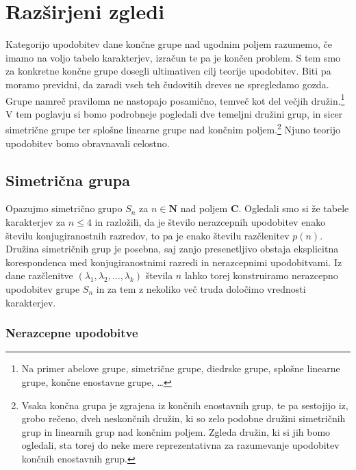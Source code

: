 \documentclass[11pt]{book}
\def\NN{\mathbf{N}}
\def\CC{\mathbf{C}}
\theoremstyle{definition}
\theoremstyle{zgled}
\theoremstyle{odprtproblem}
\theoremstyle{domacanaloga}
\theoremstyle{izrek}
\begin{document}
\chapter{Razširjeni zgledi}

Kategorijo upodobitev dane končne grupe nad ugodnim poljem razumemo, če imamo na voljo tabelo karakterjev, izračun te pa je končen problem. S tem smo za konkretne končne grupe dosegli ultimativen cilj teorije upodobitev. Biti pa moramo previdni, da zaradi vseh teh čudovitih dreves ne spregledamo gozda. Grupe namreč praviloma ne nastopajo posamično, temveč kot del večjih družin.\footnote{Na primer abelove grupe, simetrične grupe, diedrske grupe, splošne linearne grupe, končne enostavne grupe, \dots} V tem poglavju si bomo podrobneje pogledali dve temeljni družini grup, in sicer simetrične grupe ter splošne linearne grupe nad končnim poljem.\footnote{Vsaka končna grupa je zgrajena iz končnih enostavnih grup, te pa sestojijo iz, grobo rečeno, dveh neskončnih družin, ki so zelo podobne družini simetričnih grup in linearnih grup nad končnim poljem. Zgleda družin, ki si jih bomo ogledali, sta torej do neke mere reprezentativna za razumevanje upodobitev končnih enostavnih grup.} Njuno teorijo upodobitev bomo obravnavali celostno.

\section{Simetrična grupa}

Opazujmo simetrično grupo $S_n$ za $n \in \NN$ nad poljem $\CC$. Ogledali smo si že tabele karakterjev za $n \leq 4$ in razložili, da je število nerazcepnih upodobitev enako številu konjugiranostnih razredov, to pa je enako številu razčlenitev $p(n)$. Družina simetričnih grup je posebna, saj zanjo presenetljivo obstaja eksplicitna korespondenca med konjugiranostnimi razredi in nerazcepnimi upodobitvami. Iz dane razčlenitve $(\lambda_1, \lambda_2, \dots, \lambda_k)$ števila $n$ lahko torej konstruiramo nerazcepno upodobitev grupe $S_n$ in za tem z nekoliko več truda določimo vrednosti karakterjev.

\subsection{Nerazcepne upodobitve}
\end{document}
